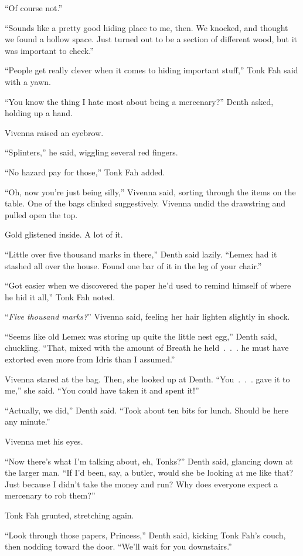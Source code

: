 “Of course not.”

“Sounds like a pretty good hiding place to me, then. We knocked, and thought we found a hollow space. Just turned out to be a section of different wood, but it was important to check.”

“People get really clever when it comes to hiding important stuff,” Tonk Fah said with a yawn.

“You know the thing I hate most about being a mercenary?” Denth asked, holding up a hand.

Vivenna raised an eyebrow.

“Splinters,” he said, wiggling several red fingers.

“No hazard pay for those,” Tonk Fah added.

“Oh, now you’re just being silly,” Vivenna said, sorting through the items on the table. One of the bags clinked suggestively. Vivenna undid the drawstring and pulled open the top.

Gold glistened inside. A lot of it.

“Little over five thousand marks in there,” Denth said lazily. “Lemex had it stashed all over the house. Found one bar of it in the leg of your chair.”

“Got easier when we discovered the paper he’d used to remind himself of where he hid it all,” Tonk Fah noted.

“\textit{Five thousand marks?}” Vivenna said, feeling her hair lighten slightly in shock.

“Seems like old Lemex was storing up quite the little nest egg,” Denth said, chuckling. “That, mixed with the amount of Breath he held~.~.~. he must have extorted even more from Idris than I assumed.”

Vivenna stared at the bag. Then, she looked up at Denth. “You~.~.~. gave it to me,” she said. “You could have taken it and spent it!”

“Actually, we did,” Denth said. “Took about ten bits for lunch. Should be here any minute.”

Vivenna met his eyes.

“Now there’s what I’m talking about, eh, Tonks?” Denth said, glancing down at the larger man. “If I’d been, say, a butler, would she be looking at me like that? Just because I didn’t take the money and run? Why does everyone expect a mercenary to rob them?”

Tonk Fah grunted, stretching again.

“Look through those papers, Princess,” Denth said, kicking Tonk Fah’s couch, then nodding toward the door. “We’ll wait for you downstairs.”

